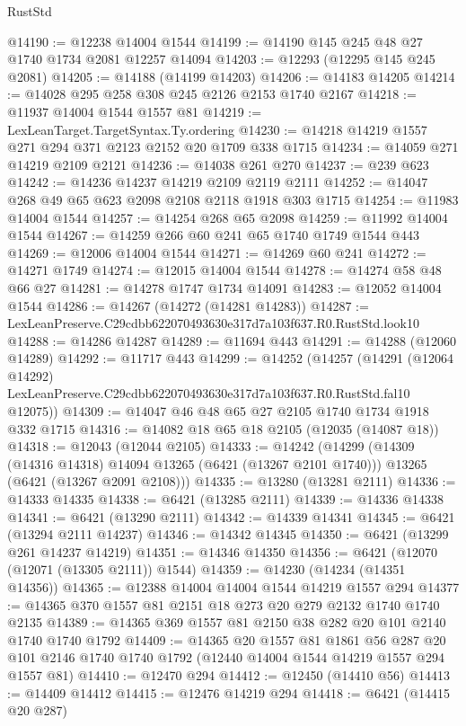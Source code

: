 \begin{lexlean}{RustStd}
\begin{coremodule}
@14190 := @12238 @14004 @1544
@14199 := @14190 @145 @245 @48 @27 @1740 @1734 @2081 @12257 @14094
@14203 := @12293 (@12295 @145 @245 @2081)
@14205 := @14188 (@14199 @14203)
@14206 := @14183 @14205
@14214 := @14028 @295 @258 @308 @245 @2126 @2153 @1740 @2167
@14218 := @11937 @14004 @1544 @1557 @81
@14219 := LexLeanTarget.TargetSyntax.Ty.ordering
@14230 := @14218 @14219 @1557 @271 @294 @371 @2123 @2152 @20 @1709 @338 @1715
@14234 := @14059 @271 @14219 @2109 @2121
@14236 := @14038 @261 @270
@14237 := @239 @623
@14242 := @14236 @14237 @14219 @2109 @2119 @2111
@14252 := @14047 @268 @49 @65 @623 @2098 @2108 @2118 @1918 @303 @1715
@14254 := @11983 @14004 @1544
@14257 := @14254 @268 @65 @2098
@14259 := @11992 @14004 @1544
@14267 := @14259 @266 @60 @241 @65 @1740 @1749 @1544 @443
@14269 := @12006 @14004 @1544
@14271 := @14269 @60 @241
@14272 := @14271 @1749
@14274 := @12015 @14004 @1544
@14278 := @14274 @58 @48 @66 @27
@14281 := @14278 @1747 @1734 @14091
@14283 := @12052 @14004 @1544
@14286 := @14267 (@14272 (@14281 @14283))
@14287 := LexLeanPreserve.C29cdbb622070493630e317d7a103f637.R0.RustStd.look10
@14288 := @14286 @14287
@14289 := @11694 @443
@14291 := @14288 (@12060 @14289)
@14292 := @11717 @443
@14299 := @14252
    (@14257
      (@14291
        (@12064 @14292)
        LexLeanPreserve.C29cdbb622070493630e317d7a103f637.R0.RustStd.fal10
        @12075))
@14309 := @14047 @46 @48 @65 @27 @2105 @1740 @1734 @1918 @332 @1715
@14316 := @14082 @18 @65 @18 @2105 (@12035 (@14087 @18))
@14318 := @12043 (@12044 @2105)
@14333 := @14242
    (@14299
      (@14309 (@14316 @14318) @14094 @13265 (@6421 (@13267 @2101 @1740)))
      @13265
      (@6421 (@13267 @2091 @2108)))
@14335 := @13280 (@13281 @2111)
@14336 := @14333 @14335
@14338 := @6421 (@13285 @2111)
@14339 := @14336 @14338
@14341 := @6421 (@13290 @2111)
@14342 := @14339 @14341
@14345 := @6421 (@13294 @2111 @14237)
@14346 := @14342 @14345
@14350 := @6421 (@13299 @261 @14237 @14219)
@14351 := @14346 @14350
@14356 := @6421 (@12070 (@12071 (@13305 @2111)) @1544)
@14359 := @14230 (@14234 (@14351 @14356))
@14365 := @12388 @14004 @14004 @1544 @14219 @1557 @294
@14377 := @14365 @370 @1557 @81 @2151 @18 @273 @20 @279 @2132 @1740 @1740 @2135
@14389 := @14365 @369 @1557 @81 @2150 @38 @282 @20 @101 @2140 @1740 @1740 @1792
@14409 := @14365
    @20
    @1557
    @81
    @1861
    @56
    @287
    @20
    @101
    @2146
    @1740
    @1740
    @1792
    (@12440 @14004 @1544 @14219 @1557 @294 @1557 @81)
@14410 := @12470 @294
@14412 := @12450 (@14410 @56)
@14413 := @14409 @14412
@14415 := @12476 @14219 @294
@14418 := @6421 (@14415 @20 @287)

\end{coremodule}
\end{lexlean}
